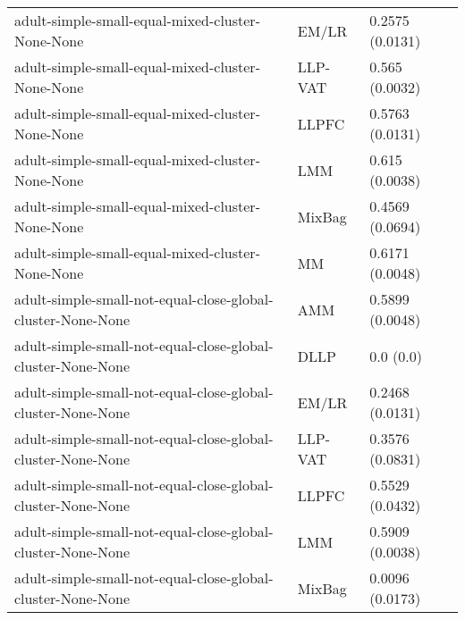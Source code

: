 \begin{longtable}{lll}
                                                             adult-simple-small-equal-mixed-cluster-None-None &     EM/LR &                           0.2575 (0.0131) \\
                                                             adult-simple-small-equal-mixed-cluster-None-None &   LLP-VAT &                            0.565 (0.0032) \\
                                                             adult-simple-small-equal-mixed-cluster-None-None &     LLPFC &                           0.5763 (0.0131) \\
                                                             adult-simple-small-equal-mixed-cluster-None-None &       LMM &                            0.615 (0.0038) \\
                                                             adult-simple-small-equal-mixed-cluster-None-None &    MixBag &                           0.4569 (0.0694) \\
                                                             adult-simple-small-equal-mixed-cluster-None-None &        MM &                           0.6171 (0.0048) \\
                                                  adult-simple-small-not-equal-close-global-cluster-None-None &       AMM &                           0.5899 (0.0048) \\
                                                  adult-simple-small-not-equal-close-global-cluster-None-None &      DLLP &                                 0.0 (0.0) \\
                                                  adult-simple-small-not-equal-close-global-cluster-None-None &     EM/LR &                           0.2468 (0.0131) \\
                                                  adult-simple-small-not-equal-close-global-cluster-None-None &   LLP-VAT &                           0.3576 (0.0831) \\
                                                  adult-simple-small-not-equal-close-global-cluster-None-None &     LLPFC &                           0.5529 (0.0432) \\
                                                  adult-simple-small-not-equal-close-global-cluster-None-None &       LMM &                           0.5909 (0.0038) \\
                                                  adult-simple-small-not-equal-close-global-cluster-None-None &    MixBag &                           0.0096 (0.0173) \\

\end{longtable}
